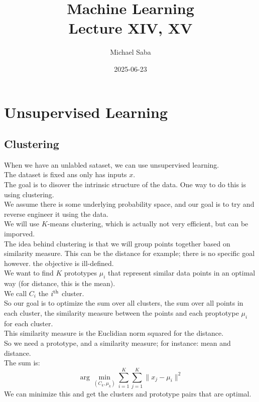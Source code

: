 \documentclass[12pt]{article}
\title{%
    \Huge Machine Learning \\
    \Large Lecture XIV, XV
}
\date{2025-06-23}
\author{Michael Saba}
\begin{document}
\maketitle
\newpage
\setlength{\parindent}{0pt}

\section*{Unsupervised Learning}
\subsection*{Clustering}

When we have an unlabled sataset, we can use
unsupervised learning. \\
The dataset is fixed ans only has inputs $x$. \\

The goal is to disover the intrinsic structure of
the data. One way to do this is using clustering. \\
We assume there is some underlying probability space,
and our goal is to try and reverse engineer it using the
data. \\

We will use $K$-means clustering, which is actually not
very efficient, but can be imporved. \\

The idea behind clustering is that we will group
points together based on similarity measure.
This can be the distance for example; there is no
specific goal however. the objective is ill-defined. \\

We want to find $K$ prototypes $\mu_i$ that represent
similar data points in an optimal way
(for distance, this is the mean). \\
We call $C_i$ the $i^{\text{th}}$ cluster. \\

So our goal is to optimize the sum over all
clusters, the sum over all points in each cluster,
the similarity measure between the points
and each proptotype $\mu_i$ for each cluster. \\
This similarity measure is the Euclidian norm
squared for the distance. \\

So we need a prototype, and a similarity measure;
for instance: mean and distance. \\

The sum is:
\[ \arg \min_{(C_k, \mu_k)} \sum_{i=1}^K \sum_{j=1}^K
\|x_j - \mu_i\|^2 \]
We can minimize this and get the clusters and prototype
pairs that are optimal. \\
\end{document}

